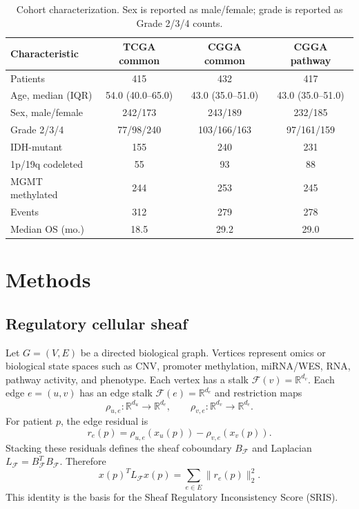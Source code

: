 \documentclass[conference]{IEEEtran}
\begin{document}
\begin{table}[t]
\caption{Cohort characterization. Sex is reported as male/female; grade is reported as Grade 2/3/4 counts.}
\label{tab:cohorts}
\centering
\begin{tabular}{lccc}
\toprule
Characteristic & TCGA common & CGGA common & CGGA pathway \\
\midrule
Patients & 415 & 432 & 417 \\
Age, median (IQR) & 54.0 (40.0--65.0) & 43.0 (35.0--51.0) & 43.0 (35.0--51.0) \\
Sex, male/female & 242/173 & 243/189 & 232/185 \\
Grade 2/3/4 & 77/98/240 & 103/166/163 & 97/161/159 \\
IDH-mutant & 155 & 240 & 231 \\
1p/19q codeleted & 55 & 93 & 88 \\
MGMT methylated & 244 & 253 & 245 \\
Events & 312 & 279 & 278 \\
Median OS (mo.) & 18.5 & 29.2 & 29.0 \\
\bottomrule
\end{tabular}
\end{table}

\section{Methods}
\subsection{Regulatory cellular sheaf}
Let $G=(V,E)$ be a directed biological graph. Vertices represent omics or biological state spaces such as CNV, promoter methylation, miRNA/WES, RNA, pathway activity, and phenotype. Each vertex has a stalk $\mathcal F(v)=\mathbb R^{d_v}$. Each edge $e=(u,v)$ has an edge stalk $\mathcal F(e)=\mathbb R^{d_e}$ and restriction maps
\begin{equation}
\rho_{u,e}:\mathbb R^{d_u}\to\mathbb R^{d_e},\qquad
\rho_{v,e}:\mathbb R^{d_v}\to\mathbb R^{d_e}.
\end{equation}
For patient $p$, the edge residual is
\begin{equation}
r_e(p)=\rho_{u,e}(x_u(p))-\rho_{v,e}(x_v(p)).
\end{equation}
Stacking these residuals defines the sheaf coboundary $B_{\mathcal F}$ and Laplacian $L_{\mathcal F}=B_{\mathcal F}^TB_{\mathcal F}$. Therefore
\begin{equation}
x(p)^TL_{\mathcal F}x(p)=\sum_{e\in E}\|r_e(p)\|_2^2.
\end{equation}
This identity is the basis for the Sheaf Regulatory Inconsistency Score (SRIS).
\end{document}
